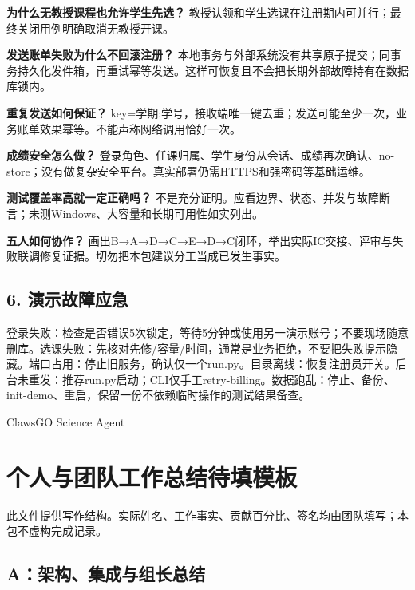 \documentclass[UTF8,11pt,a4paper]{ctexart}
\begin{document}
\textbf{为什么无教授课程也允许学生先选？}
教授认领和学生选课在注册期内可并行；最终关闭用例明确取消无教授开课。

\textbf{发送账单失败为什么不回滚注册？}
本地事务与外部系统没有共享原子提交；同事务持久化发件箱，再重试幂等发送。这样可恢复且不会把长期外部故障持有在数据库锁内。

\textbf{重复发送如何保证？}
key=学期:学号，接收端唯一键去重；发送可能至少一次，业务账单效果幂等。不能声称网络调用恰好一次。

\textbf{成绩安全怎么做？}
登录角色、任课归属、学生身份从会话、成绩再次确认、no-store；没有做复杂安全平台。真实部署仍需HTTPS和强密码等基础运维。

\textbf{测试覆盖率高就一定正确吗？}
不是充分证明。应看边界、状态、并发与故障断言；未测Windows、大容量和长期可用性如实列出。

\textbf{五人如何协作？}
画出B→A→D→C→E→D→C闭环，举出实际IC交接、评审与失败联调修复证据。切勿把本包建议分工当成已发生事实。

\hypertarget{6-ux6f14ux793aux6545ux969cux5e94ux6025}{%
\subsection{6.
演示故障应急}\label{6-ux6f14ux793aux6545ux969cux5e94ux6025}}

登录失败：检查是否错误5次锁定，等待5分钟或使用另一演示账号；不要现场随意删库。选课失败：先核对先修/容量/时间，通常是业务拒绝，不要把失败提示隐藏。端口占用：停止旧服务，确认仅一个run.py。目录离线：恢复注册员开关。后台未重发：推荐run.py启动；CLI仅手工retry-billing。数据跑乱：停止、备份、init-demo、重启，保留一份不依赖临时操作的测试结果备查。

ClawsGO Science Agent

\clearpage
\hypertarget{ux4e2aux4ebaux4e0eux56e2ux961fux5de5ux4f5cux603bux7ed3ux5f85ux586bux6a21ux677f}{%
\section{个人与团队工作总结待填模板}\label{ux4e2aux4ebaux4e0eux56e2ux961fux5de5ux4f5cux603bux7ed3ux5f85ux586bux6a21ux677f}}

此文件提供写作结构。实际姓名、工作事实、贡献百分比、签名均由团队填写；本包不虚构完成记录。

\hypertarget{aux67b6ux6784ux96c6ux6210ux4e0eux7ec4ux957fux603bux7ed3}{%
\subsection{A：架构、集成与组长总结}\label{aux67b6ux6784ux96c6ux6210ux4e0eux7ec4ux957fux603bux7ed3}}
\end{document}
